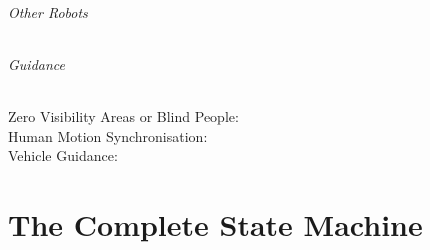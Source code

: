 \documentclass[oneside, a4paper, 12pt]{memoir}
\begin{document}
		\subparagraph{Other Robots}
		\subparagraph{Guidance}
			
			\begin{description}
				\item[Zero Visibility Areas or Blind People:]
				\item[Human Motion Synchronisation:]
				\item[Vehicle Guidance:]
			\end{description}
			


\appendix

\chapter{The Complete State Machine}
\label{app:complete_state_machine}
\end{document}
